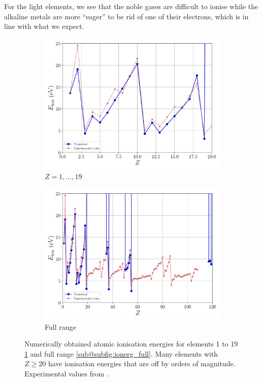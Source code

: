 \documentclass[a4paper,DIV=12,english]{scrartcl}
\begin{document}
For the light elements, we see that the noble gases are difficult to ionise while the alkaline metals are more \enquote{eager} to be rid of one of their electrons, which is in line with what we expect.

\begin{figure}
    \centering
    \begin{subfigure}{0.49\textwidth}
        \centering
        \includegraphics[width=\textwidth]{../plots/ionerg.pdf}
        \caption{$Z=1,\dots,19$}
        \label{subfig:ionerg_window}
    \end{subfigure}
    \begin{subfigure}{0.49\textwidth}
        \centering
        \includegraphics[width=\textwidth]{../plots/ionerg_full.pdf}
        \caption{Full range}
        \label{subfig:ionerg_full}
    \end{subfigure}
    \caption{Numerically obtained atomic ionisation energies for elements 1 to 19 \ref{subfig:ionerg_window} and full range \ref{sub@subfig:ionerg_full}. Many elements with $Z\geq20$ have ionisation energies that are off by orders of magnitude. Experimental values from~\cite{NIST_ASD}.}
    \label{fig:ionerg}
\end{figure}
\end{document}

